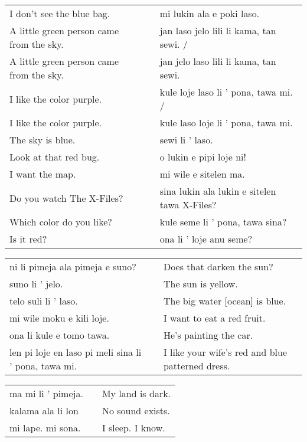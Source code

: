 \begin{supertabular}{p{5,5cm}|ll}
I don't see the blue bag.  && mi lukin ala e poki laso. \\ %
A little green person came from the sky.  && jan laso jelo lili li kama, tan sewi. / \\ %
A little green person came from the sky.  && jan jelo laso lili li kama, tan sewi. \\  %
I like the color purple.  && kule loje laso li ' pona, tawa mi. / \\ %
I like the color purple.  && kule laso loje li ' pona, tawa mi. \\ %
The sky is blue.  && sewi li ' laso. \\ %
Look at that red bug.  && o lukin e pipi loje ni!  \\ %
I want the map.  && mi wile e sitelen ma. \\ %
Do you watch The X-Files?  && sina lukin ala lukin e sitelen tawa X-Files? \\ %
Which color do you like?  && kule seme li ' pona, tawa sina? \\ %
Is it red? && ona li ' loje anu seme?  \\ %
\end{supertabular}  

\begin{supertabular}{p{5,5cm}|ll}
ni li pimeja ala pimeja e suno? && Does that darken the sun? \\
suno li ' jelo.  && The sun is yellow. \\
telo suli li ' laso.  && The big water [ocean] is blue. \\
mi wile moku e kili loje.  && I want to eat a red fruit. \\
ona li kule e tomo tawa.  && He's painting the car. \\
len pi loje en laso pi meli sina li ' pona, tawa mi. && I like your wife's red and blue patterned dress. \\
\end{supertabular}  

\begin{supertabular}{p{5,5cm}|ll}
ma mi li ' pimeja. && My land is dark. \\
kalama ala li lon && No sound exists.\\
mi lape. mi sona. && I sleep. I know. \\
\end{supertabular} 

